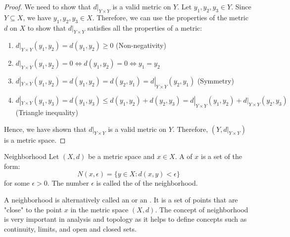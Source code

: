 \documentclass[openany]{book}
\begin{document}
\begin{proof}
    We need to show that $d|_{Y \times Y}$ is a valid metric on $Y$. Let $y_1, y_2, y_3 \in Y$. Since $Y \subseteq X$, we have $y_1, y_2, y_3 \in X$. Therefore, we can use the properties of the metric $d$ on $X$ to show that $d|_{Y \times Y}$ satisfies all the properties of a metric:
    \begin{enumerate}
        \item $d|_{Y \times Y}(y_1, y_2) = d(y_1, y_2) \geq 0$ (Non-negativity)
        \item $d|_{Y \times Y}(y_1, y_2) = 0 \iff d(y_1, y_2) = 0 \iff y_1 = y_2$ 
        \item $d|_{Y \times Y}(y_1, y_2) = d(y_1, y_2) = d(y_2, y_1) = d|_{Y \times Y}(y_2, y_1)$ (Symmetry)
        \item $d|_{Y \times Y}(y_1, y_3) = d(y_1, y_3) \leq d(y_1, y_2) + d(y_2, y_3) = d|_{Y \times Y}(y_1, y_2) + d|_{Y \times Y}(y_2, y_3)$ (Triangle inequality)
    \end{enumerate}
    Hence, we have shown that $d|_{Y \times Y}$ is a valid metric on $Y$. Therefore, $(Y, d|_{Y \times Y})$ is a metric space.
\end{proof}
\begin{mydefinition}{Neighborhood}
    Let $(X, d)$ be a metric space and $x \in X$. A  of $x$ is a set of the form:
    $$N(x, \epsilon) = \{y \in X: d(x, y) < \epsilon\}$$
    for some $\epsilon > 0$. The number $\epsilon$ is called the  of the neighborhood.
\end{mydefinition}
\begin{mynote}
    A neighborhood is alternatively called an  or an . It is a set of points that are "close" to the point $x$ in the metric space $(X, d)$. The concept of neighborhood is very important in analysis and topology as it helps to define concepts such as continuity, limits, and open and closed sets.
\end{mynote}
\end{document}
